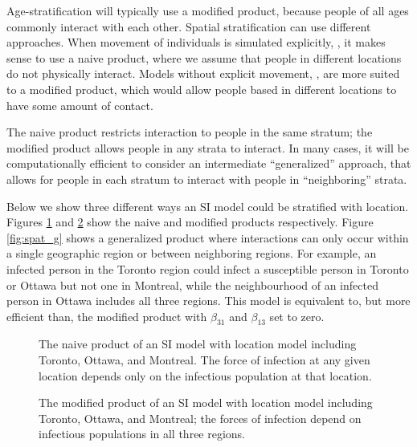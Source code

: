 \FloatBarrier

Age-stratification will typically use a modified product, because people of all ages commonly interact with each other. Spatial stratification can use different approaches. When movement of individuals is simulated explicitly, \cite[e.g.][]{mohammadi2023importation}, it makes sense to use a naive product, where we assume that people in different locations do not physically interact. Models without explicit movement, \cite[e.g.][]{dietz1995structured}, are more suited to a modified product, which would allow people based in different locations to have some amount of contact. 

The naive product restricts interaction to people in the same stratum; the modified product allows people in any strata to interact. In many cases, it will be computationally efficient to consider an intermediate “generalized” approach, that allows for people in each stratum to interact with people in “neighboring” strata.

Below we show three different ways an SI model could be stratified with location. Figures \ref{fig:spat_n} and \ref{fig:spat_m} show the naive and modified products respectively. Figure \ref{fig:spat_g} shows a generalized product where interactions can only occur within a single geographic region or between neighboring regions. For example, an infected person in the Toronto region could infect a susceptible person in Toronto or Ottawa but not one in Montreal, while the neighbourhood of an infected person in Ottawa includes all three regions.
This model is equivalent to, but more efficient than, the modified product with $\beta_{31}$ and $\beta_{13}$ set to zero. 

\FloatBarrier

\begin{figure}
    \centering
    
    \caption{The naive product of an SI model with location model including Toronto, Ottawa, and Montreal. The force of infection at any given location depends only on the infectious population at that location.}
    \label{fig:spat_n}
\end{figure}

\begin{figure}
    \centering
    
    \caption{The modified product of an SI model with location model including Toronto, Ottawa, and Montreal; the forces of infection depend on infectious populations in all three regions.}
    \label{fig:spat_m}
\end{figure}


